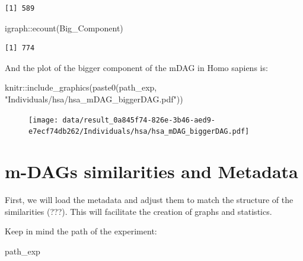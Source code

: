 \documentclass[
  letterpaper,
  DIV=11,
  numbers=noendperiod]{scrreprt}
\newenvironment{Shaded}{}{}
\newcommand{\FunctionTok}[1]{\textcolor[rgb]{0.38,0.69,0.94}{#1}}
\newcommand{\NormalTok}[1]{\textcolor[rgb]{0.67,0.70,0.75}{#1}}
\newcommand{\SpecialCharTok}[1]{\textcolor[rgb]{0.34,0.71,0.76}{#1}}
\newcommand{\StringTok}[1]{\textcolor[rgb]{0.60,0.76,0.47}{#1}}
\begin{document}
\begin{verbatim}
[1] 589
\end{verbatim}

\begin{Shaded}
\begin{Highlighting}[]
\NormalTok{igraph}\SpecialCharTok{::}\FunctionTok{ecount}\NormalTok{(Big\_Component)}
\end{Highlighting}
\end{Shaded}

\begin{verbatim}
[1] 774
\end{verbatim}

And the plot of the bigger component of the mDAG in Homo sapiens is:

\begin{Shaded}
\begin{Highlighting}[]
\NormalTok{knitr}\SpecialCharTok{::}\FunctionTok{include\_graphics}\NormalTok{(}\FunctionTok{paste0}\NormalTok{(path\_exp,}
                            \StringTok{"Individuals/hsa/hsa\_mDAG\_biggerDAG.pdf"}\NormalTok{))}
\end{Highlighting}
\end{Shaded}

\begin{figure}[H]

{\centering \texttt{[image: data/result\_0a845f74-826e-3b46-aed9-e7ecf74db262/Individuals/hsa/hsa\_mDAG\_biggerDAG.pdf]}

}

\end{figure}


\hypertarget{m-dags-similarities-and-metadata}{%
\chapter{m-DAGs similarities and
Metadata}\label{m-dags-similarities-and-metadata}}

First, we will load the metadata and adjust them to match the structure
of the similarities (???). This will facilitate the creation of graphs
and statistics.

Keep in mind the path of the experiment:

\begin{Shaded}
\begin{Highlighting}[]
\NormalTok{path\_exp}
\end{Highlighting}
\end{Shaded}
\end{document}
